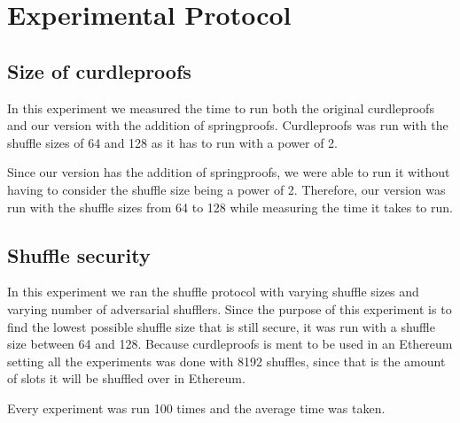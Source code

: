 
\section{Experimental Protocol}\label{sec:experimental-protocol}



\subsection{Size of curdleproofs}\label{sec:experimental-protocol-size}
In this experiment we measured the time to run both the original curdleproofs and our version with the addition of springproofs.
Curdleproofs was run with the shuffle sizes of 64 and 128 as it has to run with a power of 2.

Since our version has the addition of springproofs, we were able to run it without having to consider the shuffle size being a power of 2.
Therefore, our version was run with the shuffle sizes from 64 to 128 while measuring the time it takes to run.



\subsection{Shuffle security}\label{sec:experimental-protocol-shuffle-security}
In this experiment we ran the shuffle protocol with varying shuffle sizes and varying number of adversarial shufflers.
Since the purpose of this experiment is to find the lowest possible shuffle size that is still secure, it was run with a shuffle size between 64 and 128.
Because curdleproofs is ment to be used in an Ethereum setting all the experiments was done with 8192 shuffles, since that is the amount of slots it will be shuffled over in Ethereum.

Every experiment was run 100 times and the average time was taken.

